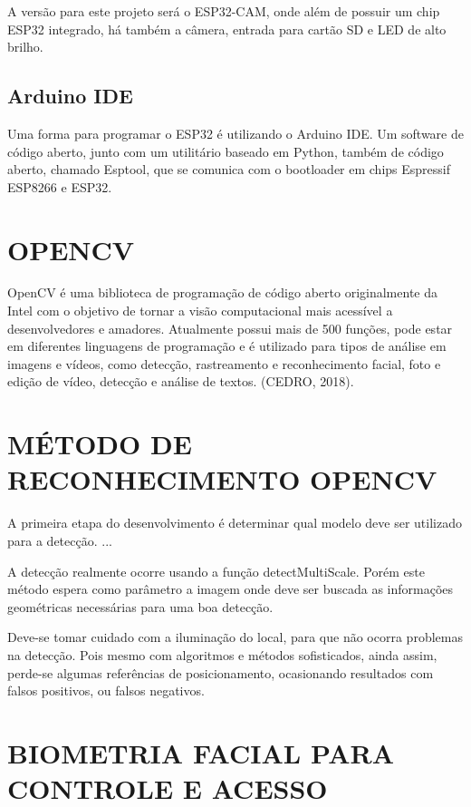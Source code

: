 A versão para este projeto será o ESP32-CAM, onde além de possuir um chip ESP32 
integrado, há também a câmera, entrada para cartão SD e LED de alto brilho.

\subsection{Arduino IDE}\label{sec:espacamento}

Uma forma para programar o ESP32 é utilizando o Arduino IDE.
Um software de código aberto, junto com um utilitário baseado em Python, também de código
aberto, chamado Esptool, que se comunica com o bootloader em chips Espressif ESP8266 e
ESP32.

\section{OPENCV}\label{sec:formatacaoTexto}

OpenCV é uma biblioteca de programação de código aberto originalmente da Intel com 
o objetivo de tornar a visão computacional mais acessível a desenvolvedores e amadores. 
Atualmente possui mais de 500 funções, pode estar em diferentes linguagens de programação e é 
utilizado para tipos de análise em imagens e vídeos, como detecção, rastreamento e 
reconhecimento facial, foto e edição de vídeo, detecção e análise de textos. (CEDRO, 2018).

\section{MÉTODO DE RECONHECIMENTO OPENCV}\label{sec:formatacaoTexto}

A primeira etapa do desenvolvimento é determinar qual modelo deve 
ser utilizado para a detecção. ...

A detecção realmente ocorre usando a função detectMultiScale. Porém este método 
espera como parâmetro a imagem onde deve ser buscada as informações geométricas 
necessárias para uma boa detecção.

Deve-se tomar cuidado com a iluminação do local, para que não ocorra problemas na 
detecção. Pois mesmo com algoritmos e métodos sofisticados, ainda assim, perde-se algumas 
referências de posicionamento, ocasionando resultados com falsos positivos, ou falsos 
negativos.

\section{BIOMETRIA FACIAL PARA CONTROLE E ACESSO}\label{sec:formatacaoTexto}

